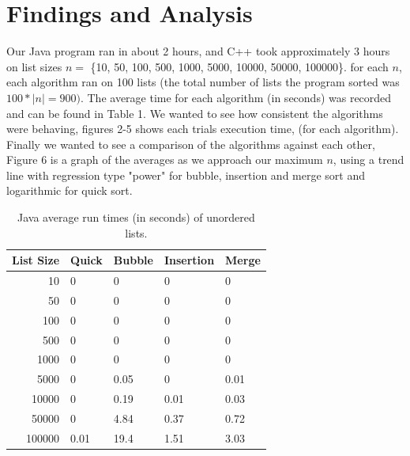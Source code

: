 \documentclass[12pt]{amsart}
\begin{document}
\section*{Findings and Analysis}
Our Java program ran in about 2 hours, and C++ took approximately 3 hours on list sizes $n = $ \{10, 50, 100, 500, 1000, 5000, 10000, 50000, 100000\}. for each $n$, each algorithm ran on 100 lists (the total number of lists the program sorted was $100 * |n| = 900)$. The average time for each algorithm (in seconds) was recorded and can be found in Table 1. We wanted to see how consistent the algorithms were behaving, figures 2-5 shows each trials execution time, (for each algorithm). Finally we wanted to see a comparison of the algorithms against each other, Figure 6 is a graph of the averages as we approach our maximum $n$, using a trend line with regression type "power" for bubble, insertion and merge sort and logarithmic for quick sort. 
\begin{table}[h]
\begin{center}
\begin{tabular}{ r | l l l l  }

List Size	&	Quick	&	Bubble	&	Insertion	&	Merge\\ \hline
10			&	0		&	0		&	0			&	0\\
50			&	0		&	0		&	0			&	0\\
100			&	0		&	0		&	0			&	0\\
500			&	0		&	0		&	0			&	0\\
1000			&	0		&	0		&	0			&	0\\
5000			&	0		&	0.05		&	0			&	0.01\\
10000		&	0		&	0.19		&	0.01			&	0.03\\
50000		&	0		&	4.84		&	0.37			&	0.72\\
100000		&	0.01		&	19.4		&	1.51			&	3.03\\

\end{tabular}
\end{center}
\caption{Java average run times (in seconds) of unordered lists.}
\end{table}
\end{document}
